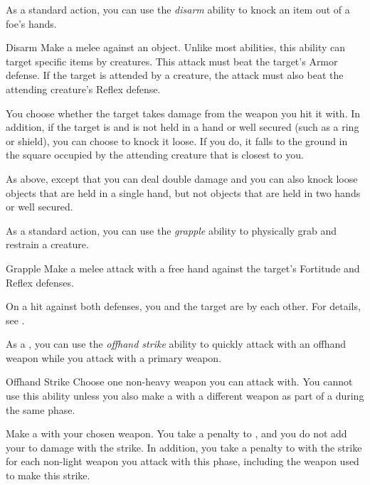          As a standard action, you can use the \textit{disarm} ability to knock an item out of a foe's hands.

        \begin{freeability}{Disarm}\label{Disarm}
            Make a melee  against an object.
            Unlike most abilities, this ability can target specific items  by creatures.
            This attack must beat the target's Armor defense.
            If the target is attended by a creature, the attack must also beat the attending creature's Reflex defense.

            \hit You choose whether the target takes damage from the weapon you hit it with.
            In addition, if the target is  and is not held in a hand or well secured (such as a ring or shield), you can choose to knock it loose.
            If you do, it falls to the ground in the square occupied by the attending creature that is closest to you.

            \crit As above, except that you can deal double damage and you can also knock loose objects that are held in a single hand, but not objects that are held in two hands or well secured.
        \end{freeability}

         As a standard action, you can use the \textit{grapple} ability to physically grab and restrain a creature.

        \begin{freeability}{Grapple}\label{Grapple}
            Make a melee attack with a free hand against the target's Fortitude and Reflex defenses.

            On a hit against both defenses, you and the target are \grappled by each other.
            For details, see .
        \end{freeability}

        \label{Offhand Strike} As a , you can use the \textit{offhand strike} ability to quickly attack with an offhand weapon while you attack with a primary weapon.
        \begin{freeability}{Offhand Strike}
            Choose one non-heavy weapon you can attack with.
            You cannot use this ability unless you also make a  with a different weapon as part of a  during the same phase.

            Make a  with your chosen weapon.
            You take a  penalty to , and you do not add your  to damage with the strike.
            In addition, you take a  penalty to  with the strike for each non-light weapon you attack with this phase, including the weapon used to make this strike.
        \end{freeability}

